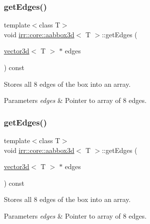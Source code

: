 \subsubsection{\texorpdfstring{get\+Edges()}{getEdges()}\hspace{0.1cm}{\footnotesize\ttfamily [1/2]}}
{\footnotesize\ttfamily template$<$class T$>$ \\
void \hyperlink{classirr_1_1core_1_1aabbox3d}{irr\+::core\+::aabbox3d}$<$ T $>$\+::get\+Edges (\begin{DoxyParamCaption}\item[{\hyperlink{classirr_1_1core_1_1vector3d}{vector3d}$<$ T $>$ $\ast$}]{edges }\end{DoxyParamCaption}) const\hspace{0.3cm}{\ttfamily [inline]}}



Stores all 8 edges of the box into an array. 


\begin{DoxyParams}{Parameters}
{\em edges} & Pointer to array of 8 edges. \\
\hline
\end{DoxyParams}
\mbox{\label{classirr_1_1core_1_1aabbox3d_acb31d9c6a79559c2636c1e32a3e2e459}} 
\subsubsection{\texorpdfstring{get\+Edges()}{getEdges()}\hspace{0.1cm}{\footnotesize\ttfamily [2/2]}}
{\footnotesize\ttfamily template$<$class T$>$ \\
void \hyperlink{classirr_1_1core_1_1aabbox3d}{irr\+::core\+::aabbox3d}$<$ T $>$\+::get\+Edges (\begin{DoxyParamCaption}\item[{\hyperlink{classirr_1_1core_1_1vector3d}{vector3d}$<$ T $>$ $\ast$}]{edges }\end{DoxyParamCaption}) const\hspace{0.3cm}{\ttfamily [inline]}}



Stores all 8 edges of the box into an array. 


\begin{DoxyParams}{Parameters}
{\em edges} & Pointer to array of 8 edges. \\
\hline
\end{DoxyParams}
\mbox{\label{classirr_1_1core_1_1aabbox3d_a6a1e82ae4fdb3cf9fac19905b772e03e}} 
